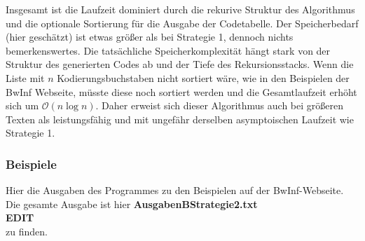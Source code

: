 \documentclass[a4paper,10pt,ngerman]{scrartcl}
\begin{document}
\vspace{1em}
Insgesamt ist die Laufzeit dominiert durch die rekurive Struktur des Algorithmus und die optionale Sortierung für die Ausgabe der Codetabelle. Der Speicherbedarf (hier geschätzt) ist etwas größer als bei Strategie 1, dennoch nichts bemerkenswertes. Die tatsächliche Speicherkomplexität hängt stark von der Struktur des generierten Codes ab und der Tiefe des Rekursionsstacks.
\newline
Wenn die Liste mit $n$ Kodierungsbuchstaben nicht sortiert wäre, wie in den Beispielen der BwInf Webseite, müsste diese noch sortiert werden und die Gesamtlaufzeit erhöht sich um $\mathcal{O}(n \log n)$. 
Daher erweist sich dieser Algorithmus auch bei größeren Texten als leistungsfähig und mit ungefähr derselben asymptoischen Laufzeit wie Strategie 1.

\subsubsection{Beispiele}
Hier die Ausgaben des Programmes zu den Beispielen auf der BwInf-Webseite. \\Die gesamte Ausgabe ist hier \textbf{AusgabenBStrategie2.txt} \\ \newline \textbf{EDIT} \\ \newline zu finden. 
\end{document}
